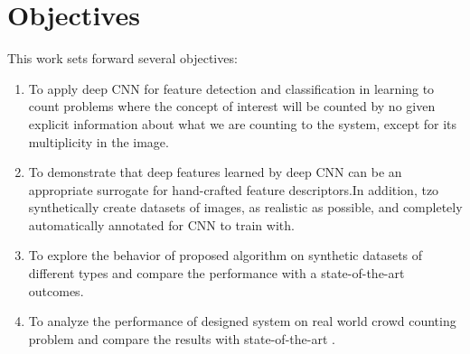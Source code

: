 \section{Objectives}
This work sets forward several objectives:
\begin{enumerate}
	\item To apply deep CNN for feature detection and classification in learning to count problems where the concept of interest will be counted by no given explicit information about what we are counting to the system, except for its multiplicity in the image.
	\item To demonstrate that deep features learned by deep CNN can be an appropriate surrogate for hand-crafted feature descriptors.In addition, tzo synthetically create datasets of images, as realistic as possible, and completely automatically annotated for CNN to train with.
	\item To explore the behavior of proposed algorithm on synthetic datasets of different types and compare the performance with a state-of-the-art outcomes\cite{segui2015learning}.   
	\item To analyze the performance of designed system on real world crowd counting problem and compare the results with state-of-the-art \cite{chan2008privacy}.   

\end{enumerate}

